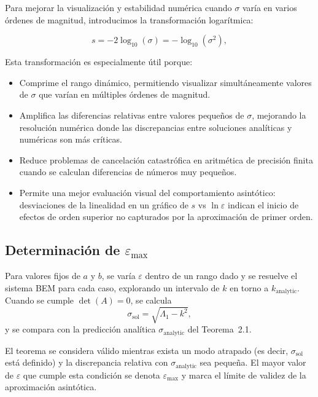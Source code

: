 \documentclass[11pt]{article}
\begin{document}
Para mejorar la visualización y estabilidad numérica cuando $\sigma$ varía en varios órdenes de magnitud, introducimos la transformación logarítmica:

\begin{equation}
s = -2 \log_{10}(\sigma) = -\log_{10}(\sigma^2),
\end{equation}

Esta transformación es especialmente útil porque:

\begin{itemize}
\item Comprime el rango dinámico, permitiendo visualizar simultáneamente valores de $\sigma$ que varían en múltiples órdenes de magnitud.

\item Amplifica las diferencias relativas entre valores pequeños de $\sigma$, mejorando la resolución numérica donde las discrepancias entre soluciones analíticas y numéricas son más críticas.

\item Reduce problemas de cancelación catastrófica en aritmética de precisión finita cuando se calculan diferencias de números muy pequeños.

\item Permite una mejor evaluación visual del comportamiento asintótico: desviaciones de la linealidad en un gráfico de $s$ vs $\ln \varepsilon$ indican el inicio de efectos de orden superior no capturados por la aproximación de primer orden.
\end{itemize}

\subsection{Determinación de $\varepsilon_{\max}$}

Para valores fijos de $a$ y $b$, se varía $\varepsilon$ dentro de un rango dado y se resuelve el sistema BEM para cada caso, explorando un intervalo de $k$ en torno a $k_{\text{analytic}}$. Cuando se cumple $\det(A) = 0$, se calcula
\begin{equation}
\sigma_{\text{sol}} = \sqrt{\Lambda_1 - k^2},
\end{equation}
y se compara con la predicción analítica $\sigma_{\text{analytic}}$ del Teorema~2.1.

El teorema se considera válido mientras exista un modo atrapado (es decir, $\sigma_{\text{sol}}$ está definido) y la discrepancia relativa con $\sigma_{\text{analytic}}$ sea pequeña. El mayor valor de $\varepsilon$ que cumple esta condición se denota $\varepsilon_{\max}$ y marca el límite de validez de la aproximación asintótica.
\end{document}
